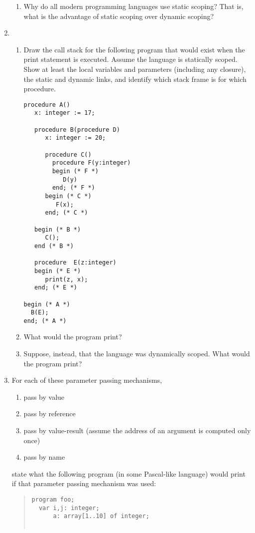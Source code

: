 \documentclass[11pt]{article}
\begin{document}
\begin{enumerate}
\begin{enumerate}
\item
  Why do all modern programming languages use static scoping? That is, what is
  the advantage of static scoping over dynamic scoping?
\end{enumerate} 


\item 
\begin{enumerate} 
\item
Draw the call stack for the following program that would exist when
the print statement is executed. Assume the language is statically
scoped.  Show at least the local variables and parameters (including
any closure), the static and dynamic links, and identify which stack
frame is for which procedure.
\begin{verbatim} 
procedure A()
   x: integer := 17;

   procedure B(procedure D)
      x: integer := 20;

      procedure C()
        procedure F(y:integer)
        begin (* F *)
           D(y)
        end; (* F *)
      begin (* C *)
         F(x);
      end; (* C *)

   begin (* B *)
      C();
   end (* B *)

   procedure  E(z:integer)
   begin (* E *)
      print(z, x);
   end; (* E *)

begin (* A *)
  B(E);
end; (* A *)
\end{verbatim} 
 
\item What would the program print?

\item Suppose, instead, that the language was dynamically scoped. What would
the program print?
\end{enumerate} 

\item 
For each of these parameter passing mechanisms, 
\begin{enumerate} 
\item pass by value
\item pass by reference
\item pass by value-result (assume the address of an argument is computed only once)
\item pass by name
\end{enumerate} 
state what the following program (in some Pascal-like language) would
print if that parameter passing mechanism was used:
\begin{quote}\begin{verbatim} 
program foo;
  var i,j: integer;
      a: array[1..10] of integer;


\end{verbatim}
\end{quote}
\end{enumerate}
\end{document}
